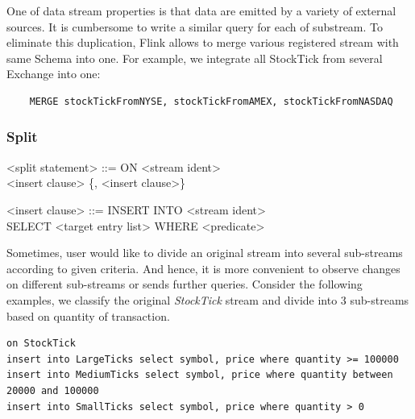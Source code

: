 One of data stream properties is that data are emitted by a variety of external sources. It is cumbersome to write a similar query for each of substream. To eliminate this duplication, Flink allows to merge various registered stream with same Schema into one. For example, we integrate all StockTick from several Exchange into one:
\begin{verbatim}
	MERGE stockTickFromNYSE, stockTickFromAMEX, stockTickFromNASDAQ
\end{verbatim}


\subsubsection{Split}
\begin{grammar}
<split statement> ::= ON <stream ident> \\
						<insert clause> \{, <insert clause>\}
						
<insert clause> ::= INSERT INTO <stream ident> \\SELECT <target entry list> WHERE <predicate>
\end{grammar}

Sometimes, user would like to divide an original stream into several sub-streams according to given criteria. And hence, it is more convenient to observe changes on different sub-streams or sends further queries. Consider the following examples, we classify the original \textit{StockTick} stream and divide into 3 sub-streams based on quantity of transaction.

\begin{verbatim}
on StockTick
insert into LargeTicks select symbol, price where quantity >= 100000
insert into MediumTicks select symbol, price where quantity between 20000 and 100000
insert into SmallTicks select symbol, price where quantity > 0
\end{verbatim}

